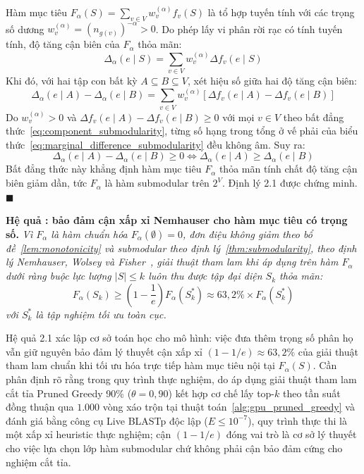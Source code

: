Hàm mục tiêu $F_\alpha(S) = \sum_{v \in V} w_v^{(\alpha)} f_v(S)$ là tổ hợp tuyến tính với các trọng số dương $w_v^{(\alpha)} = (n_{g(v)})^{-\alpha} > 0$. Do phép lấy vi phân rời rạc có tính tuyến tính, độ tăng cận biên của $F_\alpha$ thỏa mãn:
\begin{equation}
\label{eq:marginal_linear_combination}
\Delta_\alpha(e \mid S) = \sum_{v \in V} w_v^{(\alpha)} \Delta f_v(e \mid S)
\end{equation}
Khi đó, với hai tập con bất kỳ $A \subseteq B \subseteq V$, xét hiệu số giữa hai độ tăng cận biên:
\begin{equation}
\label{eq:marginal_difference_submodularity}
\Delta_\alpha(e \mid A) - \Delta_\alpha(e \mid B) = \sum_{v \in V} w_v^{(\alpha)} \left[ \Delta f_v(e \mid A) - \Delta f_v(e \mid B) \right]
\end{equation}
Do $w_v^{(\alpha)} > 0$ và $\Delta f_v(e \mid A) - \Delta f_v(e \mid B) \ge 0$ với mọi $v \in V$ theo bất đẳng thức~\eqref{eq:component_submodularity}, từng số hạng trong tổng ở vế phải của biểu thức~\eqref{eq:marginal_difference_submodularity} đều không âm. Suy ra:
\begin{equation}
\Delta_\alpha(e \mid A) - \Delta_\alpha(e \mid B) \ge 0 \iff \Delta_\alpha(e \mid A) \ge \Delta_\alpha(e \mid B)
\end{equation}
Bất đẳng thức này khẳng định hàm mục tiêu $F_\alpha$ thỏa mãn tính chất độ tăng cận biên giảm dần, tức $F_\alpha$ là hàm submodular trên $2^V$. Định lý 2.1 được chứng minh. \hfill $\blacksquare$

\noindent{}\textbf{Hệ quả \thecorollary: bảo đảm cận xấp xỉ Nemhauser cho hàm mục tiêu có trọng số.} \label{cor:nemhauser_guarantee} \textit{Vì $F_\alpha$ là hàm chuẩn hóa $F_\alpha(\emptyset) = 0$, đơn điệu không giảm theo bổ đề~\ref{lem:monotonicity} và submodular theo định lý~\ref{thm:submodularity}, theo định lý Nemhauser, Wolsey và Fisher~\cite{nemhauser1978}, giải thuật tham lam khi áp dụng trên hàm $F_\alpha$ dưới ràng buộc lực lượng $|S| \le k$ luôn thu được tập đại diện $S_k$ thỏa mãn:
\begin{equation}
\label{eq:nemhauser_guarantee_alpha}
F_\alpha(S_k) \ge \left(1 - \frac{1}{e}\right) F_\alpha(S_k^*) \approx 63{,}2\% \times F_\alpha(S_k^*)
\end{equation}
với $S_k^*$ là tập nghiệm tối ưu toàn cục.}

Hệ quả 2.1 xác lập cơ sở toán học cho mô hình: việc đưa thêm trọng số phân họ vẫn giữ nguyên bảo đảm lý thuyết cận xấp xỉ $(1 - 1/e) \approx 63{,}2\%$ của giải thuật tham lam chuẩn khi tối ưu hóa trực tiếp hàm mục tiêu nội tại $F_\alpha(S)$. Cần phân định rõ rằng trong quy trình thực nghiệm, do áp dụng giải thuật tham lam cắt tỉa Pruned Greedy 90\% ($\theta = 0{,}90$) kết hợp cơ chế lấy top-$k$ theo tần suất đồng thuận qua $1.000$ vòng xáo trộn tại thuật toán~\ref{alg:gpu_pruned_greedy} và đánh giá bằng công cụ Live BLASTp độc lập ($E \le 10^{-7}$), quy trình thực thi là một xấp xỉ heuristic thực nghiệm; cận $(1 - 1/e)$ đóng vai trò là cơ sở lý thuyết cho việc lựa chọn lớp hàm submodular chứ không phải cận bảo đảm cứng cho nghiệm cắt tỉa.

